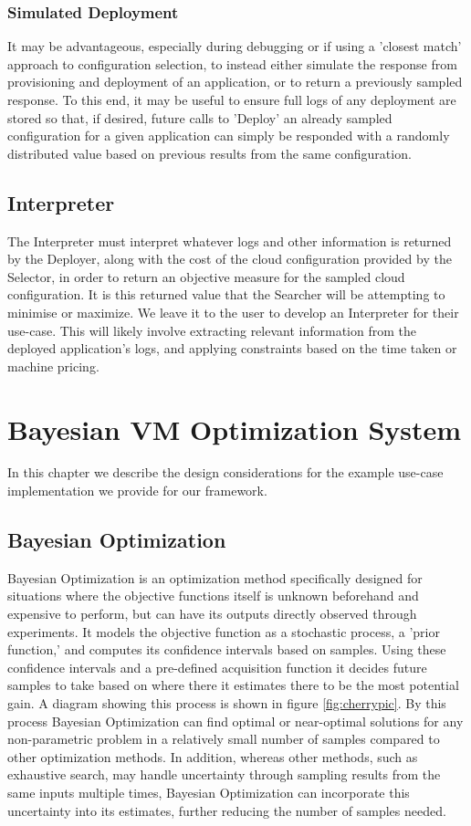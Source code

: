 \documentclass{report}
\begin{document}
\subsection{Simulated Deployment}
It may be advantageous, especially during debugging or if using a 'closest match' approach to configuration selection, to instead either simulate the response from provisioning and deployment of an application, or to return a previously sampled response. To this end, it may be useful to ensure full logs of any deployment are stored so that, if desired, future calls to 'Deploy' an already sampled configuration for a given application can simply be responded with a randomly distributed value based on previous results from the same configuration.

\section{Interpreter}
The Interpreter must interpret whatever logs and other information is returned by the Deployer, along with the cost of the cloud configuration provided by the Selector, in order to return an objective measure for the sampled cloud configuration. It is this returned value that the Searcher will be attempting to minimise or maximize. We leave it to the user to develop an Interpreter for their use-case. This will likely involve extracting relevant information from the deployed application's logs, and applying constraints based on the time taken or machine pricing. 

\chapter{Bayesian VM Optimization System}
In this chapter we describe the design considerations for the example use-case implementation we provide for our framework.

\section{Bayesian Optimization}
Bayesian Optimization is an optimization method specifically designed for situations where the objective functions itself is unknown beforehand and expensive to perform, but can have its outputs directly observed through experiments\cite{Snoek2012}. It models the objective function as a stochastic process, a 'prior function,' and computes its confidence intervals based on samples. Using these confidence intervals and a pre-defined acquisition function it decides future samples to take based on where there it estimates there to be the most potential gain. A diagram showing this process is shown in figure \ref{fig:cherrypic}. By this process Bayesian Optimization can find optimal or near-optimal solutions for any non-parametric problem in a relatively small number of samples compared to other optimization methods. In addition, whereas other methods, such as exhaustive search, may handle uncertainty through sampling results from the same inputs multiple times, Bayesian Optimization can incorporate this uncertainty into its estimates, further reducing the number of samples needed.
\end{document}
